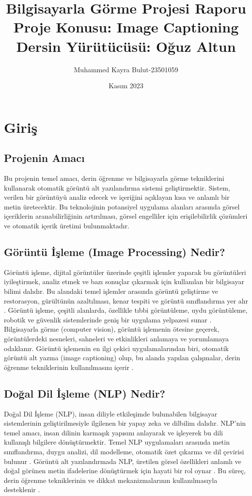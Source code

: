 \documentclass{article}
\title{Bilgisayarla Görme Projesi Raporu \\ \large Proje Konusu: Image Captioning \\ Dersin Yürütücüsü: Oğuz Altun}
\author{Muhammed Kayra Bulut-23501059}
\date{Kasım 2023}
\begin{document}
\maketitle

\section{Giriş}

\subsection{Projenin Amacı}
Bu projenin temel amacı, derin öğrenme ve bilgisayarla görme tekniklerini kullanarak otomatik görüntü alt yazılandırma sistemi geliştirmektir. Sistem, verilen bir görüntüyü analiz edecek ve içeriğini açıklayan kısa ve anlamlı bir metin üretecektir. Bu teknolojinin potansiyel uygulama alanları arasında görsel içeriklerin aranabilirliğinin artırılması, görsel engelliler için erişilebilirlik çözümleri ve otomatik içerik üretimi bulunmaktadır.
\subsection{Görüntü İşleme (Image Processing) Nedir?}
Görüntü işleme, dijital görüntüler üzerinde çeşitli işlemler yaparak bu görüntüleri iyileştirmek, analiz etmek ve bazı sonuçlar çıkarmak için kullanılan bir bilgisayar bilimi dalıdır. Bu alandaki temel işlemler arasında görüntü geliştirme ve restorasyon, gürültünün azaltılması, kenar tespiti ve görüntü sınıflandırma yer alır \cite{stefanini2022show}. Görüntü işleme, çeşitli alanlarda, özellikle tıbbi görüntüleme, uydu görüntüleme, robotik ve güvenlik sistemlerinde geniş bir uygulama yelpazesi sunar \cite{sharma2020image}. Bilgisayarla görme (computer vision), görüntü işlemenin ötesine geçerek, görüntülerdeki nesneleri, sahneleri ve etkinlikleri anlamaya ve yorumlamaya odaklanır. Görüntü işlemenin en ilgi çekici uygulamalarından biri, otomatik görüntü alt yazma (image captioning) olup, bu alanda yapılan çalışmalar, derin öğrenme tekniklerinin kullanılmasını içerir \cite{vinyals2016show} \cite{aneja2018convolutional}.

\subsection{Doğal Dil İşleme (NLP) Nedir?}
Doğal Dil İşleme (NLP), insan diliyle etkileşimde bulunabilen bilgisayar sistemlerinin geliştirilmesiyle ilgilenen bir yapay zeka ve dilbilim dalıdır. NLP'nin temel amacı, insan dilinin karmaşık yapısını anlayarak ve işleyerek bu dili kullanışlı bilgilere dönüştürmektir. Temel NLP uygulamaları arasında metin sınıflandırma, duygu analizi, dil modelleme, otomatik özet çıkarma ve dil çevirisi bulunur \cite{hossain2019comprehensive}. Görüntü alt yazılandırmada NLP, üretilen görsel özellikleri anlamlı ve doğal görünen metin ifadelerine dönüştürmek için hayati bir rol oynar \cite{vinyals2016show} \cite{yao2017boosting}. Bu süreç, derin öğrenme tekniklerinin ve dikkat mekanizmalarının kullanılmasıyla desteklenir \cite{you2016image} \cite{cornia2020meshed}.
\end{document}
